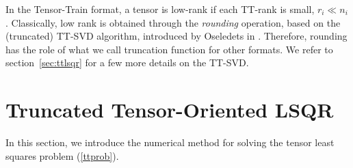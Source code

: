 \documentclass{siamart190516}
\newcommand{\cc}[1]{\mathcal{#1}}
\newcommand{\eps}[0]{\varepsilon}
\begin{document}
In the Tensor-Train format, a tensor is low-rank if each TT-rank is small, $r_i\ll n_i$. Classically, low rank is obtained through the \textit{rounding} operation, based on the (truncated) TT-SVD algorithm, introduced by Oseledets in \cite{Oseledets.2011}. Therefore, rounding has the role of what we call truncation function for other formats. We refer to section~\ref{sec:ttlsqr} for a few more details on the TT-SVD.









\section{Truncated Tensor-Oriented LSQR}\label{sec:tensor_lsqr}

In this section, we introduce the numerical method for solving the tensor least squares problem (\ref{ttprob}).
\end{document}
